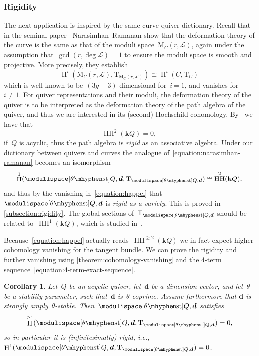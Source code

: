 \documentclass[JEP,XML,SOM,Unicode,NoEqCountersInSection,published]{cedram}
\theoremstyle{plain}
\newtheorem{alphacorollary}[alphatheorem]{Corollary}
\theoremstyle{definition}
\DeclareMathOperator\HH{H}
\DeclareMathOperator\hochschild{HH}
\newcommand\field{\mathbf{k}}
\newcommand\stable{\ensuremath{\mhyphen\mathrm{st}}}
\newcommand\tangent{\ensuremath{\mathrm{T}}}
\newcommand\tuple[1]{\ensuremath{{\boldsymbol{#1}}}}
\begin{document}
\subsubsection*{Rigidity}
The next application is inspired by the same curve-quiver dictionary.
Recall that in the seminal paper~\cite{MR0384797} Narasimhan--Ramanan show
that the deformation theory of the curve
is the same as that of the moduli space~$\mathrm{M}_C(r,\mathcal{L})$,
again under the assumption that~$\gcd(r,\deg\mathcal{L})=1$ to ensure the moduli space is smooth and projective.
More precisely,
they establish
\begin{equation}
\label{equation:narasimhan-ramanan}
\HH^i(\mathrm{M}_C(r,\mathcal{L}),\tangent_{\mathrm{M}_C(r,\mathcal{L})})
\cong
\HH^i(C,\tangent_C)
\end{equation}
which is well-known to be~$(3g-3)$-dimensional for~$i=1$,
and vanishes for~$i\neq 1$.
For quiver representations and their moduli,
the deformation theory of the quiver
is to be interpreted as the deformation theory of the path algebra of the quiver,
and thus we are interested in its (second) Hochschild cohomology.
By~\cite[\S1.6]{MR1035222} we have that
\begin{equation}
\label{equation:happel}
\hochschild^2(\field Q)=0,
\end{equation}
if~$Q$ is acyclic,
thus the path algebra is \emph{rigid} as an associative algebra.
Under our dictionary between quivers and curves
the analogue of~\eqref{equation:narasimhan-ramanan}
becomes an isomorphism
\begin{equation*}
\HH^1(\modulispace[\theta\stable]{Q,\tuple{d}},\tangent_{\modulispace[\theta\stable]{Q,\tuple{d}}})
\cong
\hochschild^2(\field Q),
\end{equation*}
and thus by the vanishing in~\eqref{equation:happel}
that~$\modulispace[\theta\stable]{Q,\tuple{d}}$
is \emph{rigid as a variety}.
This is proved in \cref{subsection:rigidity}.
The global sections of~$\tangent_{\modulispace[\theta\stable]{Q,\tuple{d}}}$
should be related to~$\hochschild^1(\field Q)$,
which is studied in~\cite{MR4883104}.

Because~\eqref{equation:happel} actually reads~$\hochschild^{\geq 2}(\field Q)$
we in fact expect higher cohomology vanishing for the tangent bundle.
We can prove the rigidity and further vanishing using \cref{theorem:cohomology-vanishing}
and the 4-term sequence~\eqref{equation:4-term-exact-sequence}.

\begin{alphacorollary}
\label{corollary:rigidity}
Let~$Q$ be an acyclic quiver,
let~$\tuple{d}$ be a dimension vector,
and let~$\theta$ be a stability parameter,
such that~$\tuple{d}$ is~$\theta$-coprime.
Assume furthermore that $\tuple{d}$ is strongly amply~$\theta$-stable.
Then~$\modulispace[\theta\stable]{Q,\tuple{d}}$ satisfies
\begin{equation*}
\HH^{\geq 1}(\modulispace[\theta\stable]{Q,\tuple{d}},\tangent_{\modulispace[\theta\stable]{Q,\tuple{d}}})=0,
\end{equation*}
so in particular it is (infinitesimally) rigid,
i.e.,~$\HH^1(\modulispace[\theta\stable]{Q,\tuple{d}},\tangent_{\modulispace[\theta\stable]{Q,\tuple{d}}})=0$.
\end{alphacorollary}
\end{document}
